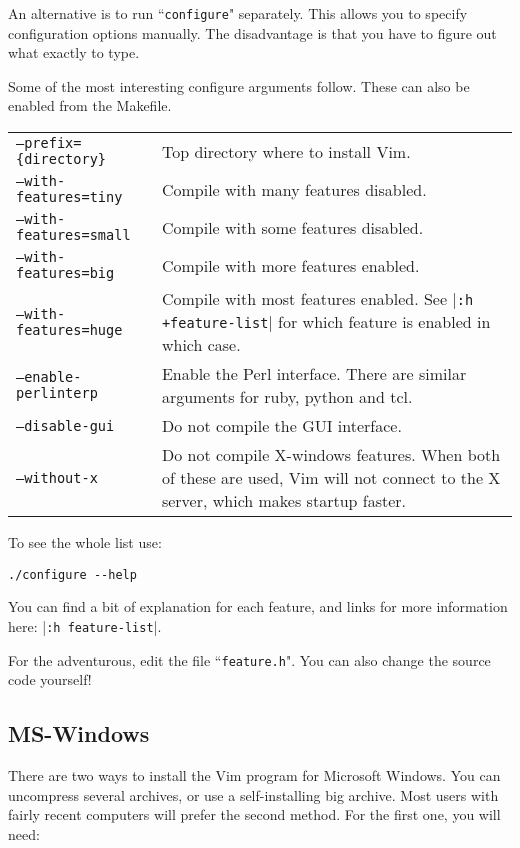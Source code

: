 An alternative is to run ``\texttt{configure}" separately.
This allows you to specify configuration options manually.
The disadvantage is that you have to figure out what exactly to type.

Some of the most interesting configure arguments follow.
These can also be enabled from the Makefile.

\begin{center} \begin{tabularx}{\textwidth}{l X}
				\texttt{--prefix=\{directory\}} & Top directory where to install Vim. \\
				\texttt{--with-features=tiny} & Compile with many features disabled. \\
				\texttt{--with-features=small} & Compile with some features disabled. \\
				\texttt{--with-features=big} & Compile with more features enabled. \\
				\texttt{--with-features=huge} & Compile with most features enabled.  See |\texttt{:h +feature-list}| for which feature is enabled in which case. \\
				\texttt{--enable-perlinterp} & Enable the Perl interface.  There are similar arguments for ruby, python and tcl. \\
				\texttt{--disable-gui} & Do not compile the GUI interface. \\
				\texttt{--without-x} & Do not compile X-windows features.  When both of these are used, Vim will not connect to the X server, which makes startup faster. \\
\end{tabularx} \end{center}

To see the whole list use:

\begin{Verbatim}[samepage=true]
 ./configure --help
\end{Verbatim}

You can find a bit of explanation for each feature, and links for more information here: |\texttt{:h feature-list}|.

For the adventurous, edit the file ``\texttt{feature.h}".
You can also change the source code yourself!
\subsection{MS-Windows}
There are two ways to install the Vim program for Microsoft Windows.
You can uncompress several archives, or use a self-installing big archive.
Most users with fairly recent computers will prefer the second method.
For the first one, you will need:

